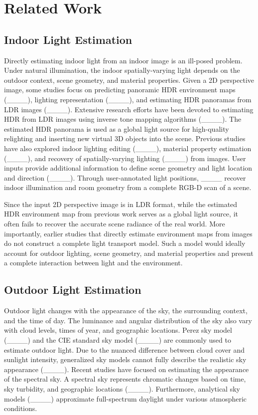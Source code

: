\section{Related Work}
\subsection{Indoor Light Estimation}
Directly estimating indoor light from an indoor image is an ill-posed problem. Under natural illumination, the indoor spatially-varying light depends on the outdoor context,  scene geometry, and material properties. 
Given a 2D perspective image, some studies focus on predicting panoramic HDR environment maps (____), lighting representation (____), and estimating HDR panoramas from LDR images (____). Extensive research efforts have been devoted to estimating HDR from LDR images using inverse tone mapping algorithms (____). The estimated HDR panorama is used as a global light source for high-quality relighting and inserting new virtual 3D objects into the scene. Previous studies have also explored indoor lighting editing (____), material property estimation (____), and recovery of spatially-varying lighting (____) from images. User inputs provide additional information to define scene geometry and light location and direction (____). Through user-annotated light positions, ____ recover indoor illumination and room geometry from a complete RGB-D scan of a scene.

Since the input 2D perspective image is in LDR format, while the estimated HDR environment map from previous work serves as a global light source, it often fails to recover the accurate scene radiance of the real world. More importantly, earlier studies that directly estimate environment maps from images do not construct a complete light transport model. Such a model would ideally account for outdoor lighting, scene geometry, and material properties and present a complete interaction between light and the environment.


\subsection{Outdoor Light Estimation}
Outdoor light changes with the appearance of the sky, the surrounding context, and the time of day. The luminance and angular distribution of the sky also vary with cloud levels, times of year, and geographic locations. Perez sky model (____) and the CIE standard sky model (____) are commonly used to estimate outdoor light. Due to the nuanced difference between cloud cover and sunlight intensity, generalized sky models cannot fully describe the realistic sky appearance (____). Recent studies have focused on estimating the appearance of the spectral sky. A spectral sky represents chromatic changes based on time, sky turbidity, and geographic locations (____). Furthermore, analytical sky models (____) approximate full-spectrum daylight under various atmospheric conditions.  

